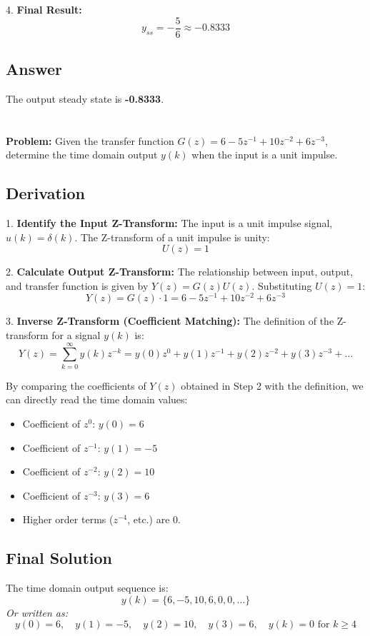 \documentclass[a4paper,12pt]{article}
\begin{document}
4.  \textbf{Final Result:}
    $$ y_{ss} = -\frac{5}{6} \approx -0.8333 $$

\subsection{Answer}
The output steady state is \textbf{-0.8333}.


\section{}

\textbf{Problem:} Given the transfer function $G(z) = 6 - 5z^{-1} + 10z^{-2} + 6z^{-3}$, determine the time domain output $y(k)$ when the input is a unit impulse.

\subsection{Derivation}

1.  \textbf{Identify the Input Z-Transform:}
    The input is a unit impulse signal, $u(k) = \delta(k)$.
    The Z-transform of a unit impulse is unity:
    $$ U(z) = 1 $$

2.  \textbf{Calculate Output Z-Transform:}
    The relationship between input, output, and transfer function is given by $Y(z) = G(z)U(z)$.
    Substituting $U(z) = 1$:
    $$ Y(z) = G(z) \cdot 1 = 6 - 5z^{-1} + 10z^{-2} + 6z^{-3} $$

3.  \textbf{Inverse Z-Transform (Coefficient Matching):}
    The definition of the Z-transform for a signal $y(k)$ is:
    $$ Y(z) = \sum_{k=0}^{\infty} y(k)z^{-k} = y(0)z^0 + y(1)z^{-1} + y(2)z^{-2} + y(3)z^{-3} + \dots $$
    
    By comparing the coefficients of $Y(z)$ obtained in Step 2 with the definition, we can directly read the time domain values:
    \begin{itemize}
        \item Coefficient of $z^0$: $y(0) = 6$
        \item Coefficient of $z^{-1}$: $y(1) = -5$
        \item Coefficient of $z^{-2}$: $y(2) = 10$
        \item Coefficient of $z^{-3}$: $y(3) = 6$
        \item Higher order terms ($z^{-4}$, etc.) are 0.
    \end{itemize}

\subsection{Final Solution}
The time domain output sequence is:
$$ y(k) = \{6, -5, 10, 6, 0, 0, \dots\} $$
\textit{Or written as:}
$$ y(0)=6, \quad y(1)=-5, \quad y(2)=10, \quad y(3)=6, \quad y(k)=0 \text{ for } k \ge 4 $$
\end{document}
